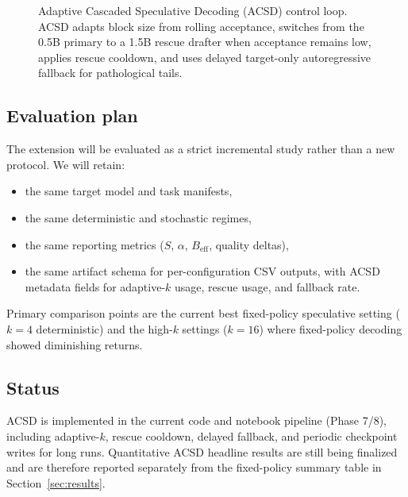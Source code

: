 \begin{figure}[t]
{%
}
\caption{Adaptive Cascaded Speculative Decoding (ACSD) control loop. ACSD
adapts block size from rolling acceptance, switches from the 0.5B primary to a
1.5B rescue drafter when acceptance remains low, applies rescue cooldown, and
uses delayed target-only autoregressive fallback for pathological tails.}
\label{fig:acsd-flow}
\end{figure}

\subsection{Evaluation plan}

The extension will be evaluated as a strict incremental study rather than a new
protocol. We will retain:
\begin{itemize}
  \item the same target model and task manifests,
  \item the same deterministic and stochastic regimes,
  \item the same reporting metrics ($S$, $\alpha$, $B_{\text{eff}}$, quality deltas),
  \item the same artifact schema for per-configuration CSV outputs, with ACSD
        metadata fields for adaptive-$k$ usage, rescue usage, and fallback rate.
\end{itemize}

Primary comparison points are the current best fixed-policy speculative
setting ($k{=}4$ deterministic) and the high-$k$ settings ($k{=}16$) where
fixed-policy decoding showed diminishing returns.

\subsection{Status}

ACSD is implemented in the current code and notebook pipeline (Phase 7/8),
including adaptive-$k$, rescue cooldown, delayed fallback, and periodic
checkpoint writes for long runs. Quantitative ACSD headline results are still
being finalized and are therefore reported separately from the fixed-policy
summary table in Section~\ref{sec:results}.
